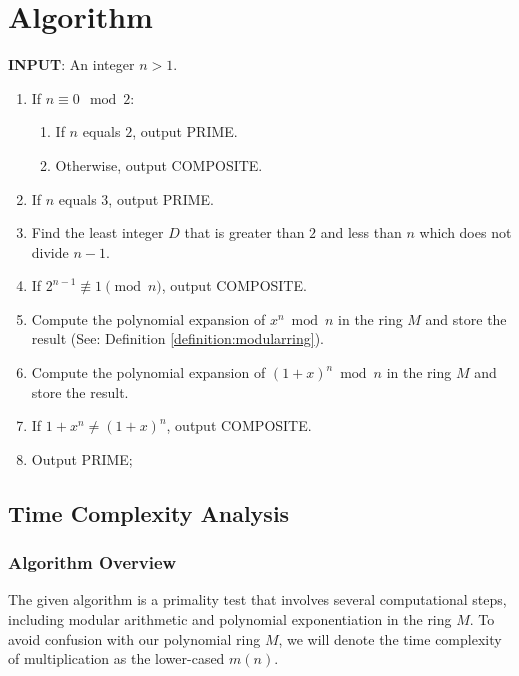 \documentclass{article}
\theoremstyle{plain}
\theoremstyle{definition}
\newcommand{\Mx}{M}
\begin{document}
\section{Algorithm} \label{section:algorithm}
\textbf{INPUT}: An integer $n > 1$.
\begin{center}
    \begin{enumerate}
        \item If $n \equiv 0 \mod{2}$:
            \begin{enumerate}
                \item If $n$ equals $2$, output PRIME.
                \item Otherwise, output COMPOSITE.
            \end{enumerate}
        \item If $n$ equals $3$, output PRIME.
        \item Find the least integer $D$ that is greater than $2$ and less than $n$ which does not divide $n-1$.
        \item If $2^{n-1} \not\equiv 1 \pmod{n}$, output COMPOSITE.
        \item Compute the polynomial expansion of $x^n \bmod{n}$ in the ring $\Mx$ and store the result (See: Definition \ref{definition:modularring}).
        \item Compute the polynomial expansion of $(1 + x)^n \bmod{n}$ in the ring $\Mx$ and store the result.
        \item If $1 + x^n \not= (1 + x)^n$, output COMPOSITE.
        \item Output PRIME;
    \end{enumerate}
\end{center}

\subsection{Time Complexity Analysis} \label{subsection:timecomplexity}

\subsubsection{Algorithm Overview}
The given algorithm is a primality test that involves several computational steps, including modular arithmetic and polynomial exponentiation in the ring $\Mx$. To avoid confusion with our polynomial ring $\Mx$, we will denote the time complexity of multiplication as the lower-cased $m(n)$.
\end{document}
